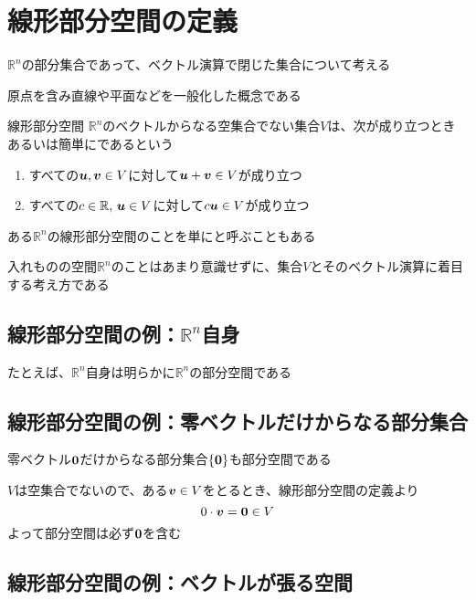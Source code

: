 \documentclass[../../../topic_linear-algebra]{subfiles}
\begin{document}
\sectionline
\section{線形部分空間の定義}

$\mathbb{R}^n$の部分集合であって、ベクトル演算で閉じた集合について考える

原点を含み直線や平面などを一般化した概念である

\begin{definition}{線形部分空間}
  $\mathbb{R}^n$のベクトルからなる空集合でない集合$V$は、次が成り立つときあるいは簡単にであるという
  \begin{enumerate}[label=\romanlabel]
    \item すべての$\vb*{u}, \vb*{v} \in V$に対して$\vb*{u} + \vb*{v} \in V$が成り立つ
    \item すべての$c \in \mathbb{R},\,\vb*{u} \in V$に対して$c \vb*{u} \in V$が成り立つ
  \end{enumerate}
\end{definition}

ある$\mathbb{R}^n$の線形部分空間のことを単にと呼ぶこともある

入れものの空間$\mathbb{R}^n$のことはあまり意識せずに、集合$V$とそのベクトル演算に着目する考え方である

\subsection{線形部分空間の例：$\mathbb{R}^n$自身}

たとえば、$\mathbb{R}^n$自身は明らかに$\mathbb{R}^n$の部分空間である

\subsection{線形部分空間の例：零ベクトルだけからなる部分集合}

零ベクトル$\vb*{0}$だけからなる部分集合$\{ \vb*{0} \}$も部分空間である

\br

$V$は空集合でないので、ある$\vb*{v} \in V$をとるとき、線形部分空間の定義より
\begin{equation*}
  0 \cdot \vb*{v} = \vb*{0} \in V
\end{equation*}
よって部分空間は必ず$\vb*{0}$を含む

\subsection{線形部分空間の例：ベクトルが張る空間}
\end{document}
